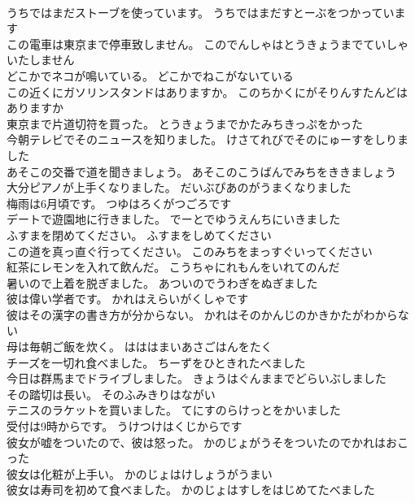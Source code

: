 \documentclass[8pt]{extreport}
\begin{document}
\begin{CJK}{UTF8}{min}
\\	うちではまだストーブを使っています。	うちではまだすとーぶをつかっています 
\\	この電車は東京まで停車致しません。	このでんしゃはとうきょうまでていしゃいたしません 
\\	どこかでネコが鳴いている。	どこかでねこがないている 
\\	この近くにガソリンスタンドはありますか。	このちかくにがそりんすたんどはありますか 
\\	東京まで片道切符を買った。	とうきょうまでかたみちきっぷをかった 
\\	今朝テレビでそのニュースを知りました。	けさてれびでそのにゅーすをしりました 
\\	あそこの交番で道を聞きましょう。	あそこのこうばんでみちをききましょう 
\\	大分ピアノが上手くなりました。	だいぶぴあのがうまくなりました 
\\	梅雨は6月頃です。	つゆはろくがつごろです 
\\	デートで遊園地に行きました。	でーとでゆうえんちにいきました 
\\	ふすまを閉めてください。	ふすまをしめてください 
\\	この道を真っ直ぐ行ってください。	このみちをまっすぐいってください 
\\	紅茶にレモンを入れて飲んだ。	こうちゃにれもんをいれてのんだ 
\\	暑いので上着を脱ぎました。	あついのでうわぎをぬぎました 
\\	彼は偉い学者です。	かれはえらいがくしゃです 
\\	彼はその漢字の書き方が分からない。	かれはそのかんじのかきかたがわからない 
\\	母は毎朝ご飯を炊く。	はははまいあさごはんをたく 
\\	チーズを一切れ食べました。	ちーずをひときれたべました 
\\	今日は群馬までドライブしました。	きょうはぐんままでどらいぶしました 
\\	その踏切は長い。	そのふみきりはながい 
\\	テニスのラケットを買いました。	てにすのらけっとをかいました 
\\	受付は9時からです。	うけつけはくじからです 
\\	彼女が嘘をついたので、彼は怒った。	かのじょがうそをついたのでかれはおこった 
\\	彼女は化粧が上手い。	かのじょはけしょうがうまい 
\\	彼女は寿司を初めて食べました。	かのじょはすしをはじめてたべました 

\end{CJK}
\end{document}
